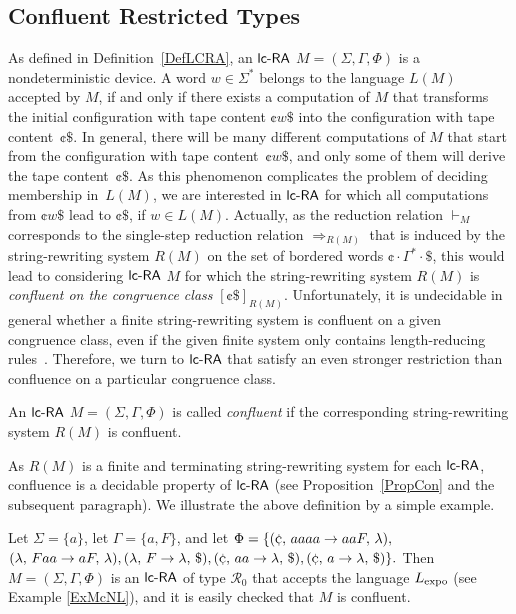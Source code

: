 \subsection{Confluent Restricted Types}

As defined in Definition~\ref{DefLCRA}, an $\lcRA$ $M=(\Sigma,\Gamma,\Phi)$ is a nondeterministic device. A word $w\in\Sigma^*$ belongs to the language $L(M)$ accepted by $M$, if and only if there exists a computation of $M$ that transforms the initial configuration with tape content $\cent w\$$ into the configuration with tape content~$\cent\$$. In general, there will be many different computations of $M$ that start from the configuration with tape content~$\cent w\$$, and only some of them will derive the tape content~$\cent \$$. As this phenomenon complicates the problem of deciding membership in~$L(M)$, we are interested in $\lcRA$ for which all computations from $\cent w\$$ lead to $\cent\$$, if $w\in L(M)$. Actually, as the reduction relation $\vdash_M$ corresponds to the single-step reduction relation $\Rightarrow_{R(M)}$ that is induced by the string-rewriting system $R(M)$ on the set of bordered words $\cent\cdot\Gamma^*\cdot \$$, this would lead to considering $\lcRA$ $M$ for which the string-rewriting system $R(M)$ is \emph{confluent on the congruence class} $[\cent\$]_{R(M)}$. Unfortunately, it is undecidable in general whether a finite string-rewriting system is confluent on a given congruence class, even if the given finite system only contains length-reducing rules~\cite{otto27}. Therefore, we turn to $\lcRA$ that satisfy an even stronger restriction than confluence on a particular congruence class.
%
\begin{definition}\label{DefConf}
An $\lcRA$ $M=(\Sigma,\Gamma,\Phi)$ is called \emph{confluent} if the corresponding string-rewriting system $R(M)$ is confluent.
\end{definition}

As $R(M)$ is a finite and terminating string-rewriting system for each $\lcRA$, confluence is a decidable property of $\lcRA$ (see Proposition~\ref{PropCon} and the subsequent paragraph). We illustrate the above definition by a simple example.

\begin{example}\label{ExConLcR}
 Let $\Sigma=\{a\}$, let $\Gamma = \{a,F\}$, and let 
$\Phi=\{\rarule{\cent}{aaaa}{aaF}{\lambda},$ $\rarule{\lambda}{Faa}{aF}{\lambda},
        \rarule{\lambda}{F}{\lambda}{\$},\rarule{\cent}{aa}{\lambda}{\$},\rarule{\cent}{a}{\lambda}{\$}\}.$ Then $M=(\Sigma,\Gamma,\Phi)$ is an $\lcRA$ of type $\mathcal{R}_0$ that accepts the language $L_{\rm expo}$ (see Example \ref{ExMcNL}), and it is easily checked that $M$ is confluent.
\end{example}

